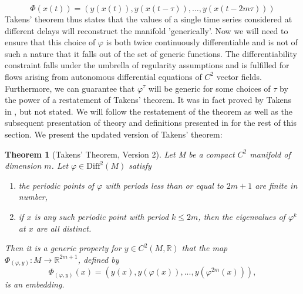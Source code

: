 \documentclass[11pt, a4paper]{memoir}
\theoremstyle{break}
\newtheorem{thm}{Theorem}
\theoremstyle{break}
\theoremstyle{nonumberplain}
\newcommand{\mR}{\mathbb{R}}
\begin{document}
$$\Phi(x(t))=(y(x(t)),y(x(t-\tau)),\ldots,y(x(t-2m\tau)))$$
Takens' theorem thus states that the values of a single time series considered at different delays will reconstruct the manifold 'generically'. Now we will need to ensure that this choice of $\varphi$ is both twice continuously differentiable and is not of such a nature that it falls out of the set of generic functions. The differentiability constraint falls under the umbrella of regularity assumptions and is fulfilled for flows arising from autonomous differential equations of $C^2$ vector fields. Furthermore, we can guarantee that $\varphi^\tau$ will be generic for some choices of $\tau$ by the power of a restatement of Takens' theorem. It was in fact proved by Takens in \cite{Takens}, but not stated. We will follow the restatement of the theorem as well as the subsequent presentation of theory and definitions presented in \cite{Huke} for the rest of this section. We present the updated version of Takens' theorem:
\begin{thm}[Takens' Theorem, Version 2]\label{v2}
Let M be a compact $C^2$ manifold of dimension $m$. Let $\varphi\in\text{Diff}^2(M)$ satisfy
\begin{enumerate}[label=\arabic*)]
	\item the periodic points of $\varphi$ with periods less than or equal to $2m+1$ are finite in number,
	\item if $x$ is any such periodic point with period $k\leqslant 2m$, then the eigenvalues of $\varphi^k$ at $x$ are all distinct.
\end{enumerate}
 Then it is a generic property for $y\in C^2(M,\mR)$ that the map $\Phi_{(\varphi,y)}:M\to \mathbb{R}^{2m+1}$, defined by
$$\Phi_{(\varphi,y)}(x)=(y(x),y(\varphi(x)),...,y(\varphi^{2m}(x))),$$
is an embedding. \cite{Huke}
\end{thm}
\end{document}
